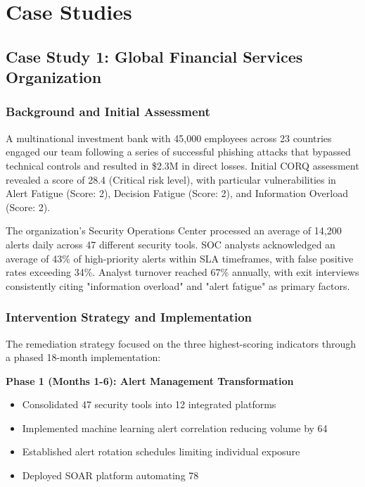 \documentclass[11pt,a4paper]{article}
\begin{document}
\section{Case Studies}

\subsection{Case Study 1: Global Financial Services Organization}

\subsubsection{Background and Initial Assessment}

A multinational investment bank with 45,000 employees across 23 countries engaged our team following a series of successful phishing attacks that bypassed technical controls and resulted in \$2.3M in direct losses. Initial CORQ assessment revealed a score of 28.4 (Critical risk level), with particular vulnerabilities in Alert Fatigue (Score: 2), Decision Fatigue (Score: 2), and Information Overload (Score: 2).

The organization's Security Operations Center processed an average of 14,200 alerts daily across 47 different security tools. SOC analysts acknowledged an average of 43\% of high-priority alerts within SLA timeframes, with false positive rates exceeding 34\%. Analyst turnover reached 67\% annually, with exit interviews consistently citing "information overload" and "alert fatigue" as primary factors.

\subsubsection{Intervention Strategy and Implementation}

The remediation strategy focused on the three highest-scoring indicators through a phased 18-month implementation:

\textbf{Phase 1 (Months 1-6): Alert Management Transformation}
\begin{itemize}
\item Consolidated 47 security tools into 12 integrated platforms
\item Implemented machine learning alert correlation reducing volume by 64%
\item Established alert rotation schedules limiting individual exposure
\item Deployed SOAR platform automating 78%
\end{itemize}
\end{document}
